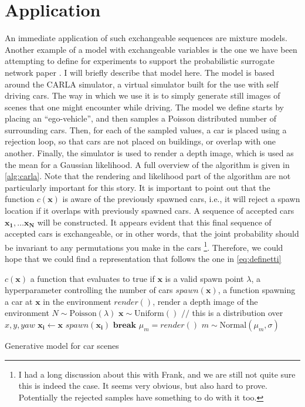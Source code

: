 \documentclass{article}
\begin{document}
\section{Application}
An immediate application of such exchangeable sequences are mixture models. Another example of a model with exchangeable variables is the one we have been attempting to define for experiments to support the probabilistic surrogate network paper \cite{Munk2019}. I will briefly describe that model here. The model is based around the CARLA \cite{Dosovitskiy17} simulator, a virtual simulator built for the use with self driving cars. The way in which we use it is to simply generate still images of scenes that one might encounter while driving. The model we define starts by placing an ``ego-vehicle'', and then samples a Poisson distributed number of surrounding cars. Then, for each of the sampled values, a car is placed using a rejection loop, so that cars are not placed on buildings, or overlap with one another. Finally, the simulator is used to render a depth image, which is used as the mean for a Gaussian likelihood. A full overview of the algorithm is given in \autoref{alg:carla}. Note that the rendering and likelihood part of the algorithm are not particularly important for this story. It is important to point out that the function $c(\mathbf{x})$ is aware of the previously spawned cars, i.e., it will reject a spawn location if it overlaps with previously spawned cars. A sequence of accepted cars $\mathbf{x_1}, \dots \mathbf{x_N}$ will be constructed. It appears evident that this final sequence of accepted cars is exchangeable, or in other words, that the joint probability should be invariant to any permutations you make in the cars \footnote{I had a long discussion about this with Frank, and we are still not quite sure this is indeed the case. It seems very obvious, but also hard to prove. Potentially the rejected samples have something to do with it too.}. Therefore, we could hope that we could find a representation that follows the one in \autoref{eq:definetti}

\begin{algorithm}
\begin{algorithmic}[1]
\Require $c(\mathbf{x})$ a function that evaluates to true if $\mathbf{x}$ is a valid spawn point
\Require $\lambda$, a hyperparameter controlling the number of cars
\Require $spawn(\mathbf{x})$, a function spawning a car at $\mathbf{x}$ in the environment
\Require $render()$, render a depth image of the environment
\State $N \sim \mathrm{Poisson}(\lambda)$
\State $\mathbf{x} \sim \mathrm{Uniform}()$ \hfill $//$ this is a distribution over $x,y,yaw$
  \State $\mathbf{x_i} \gets \mathbf{x}$
  \State $spawn(\mathbf{x_i})$
  \State $\mathbf{break}$
\EndIf
\EndWhile
\EndFor
\State $\mu_m = render()$
\State $m \sim \mathrm{Normal}(\mu_m, \sigma)$
\end{algorithmic}
\caption{\label{alg:carla} Generative model for car scenes}
\end{algorithm}
\end{document}
